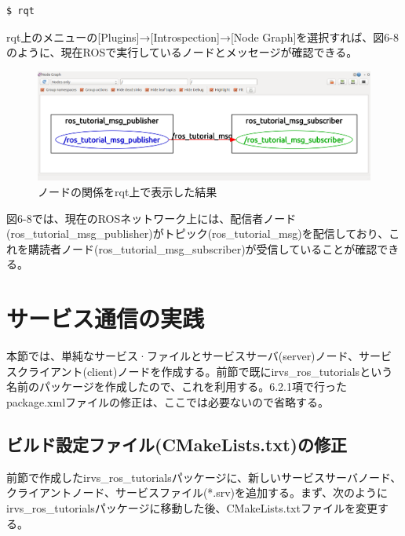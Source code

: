 \begin{lstlisting}[language=ROS]
$ rqt
\end{lstlisting}

rqt上のメニューの[Plugins]→[Introspection]→[Node Graph]を選択すれば、図6-8のように、現在ROSで実行しているノードとメッセージが確認できる。

\begin{figure}[htp]
  \centering
  \includegraphics[width=\columnwidth]{pictures/chapter6/pic_06_08.png}
  \caption{ノードの関係をrqt上で表示した結果}
\end{figure}

図6-8では、現在のROSネットワーク上には、配信者ノード(ros\_tutorial\_msg\_publisher)がトピック(ros\_tutorial\_msg)を配信しており、これを購読者ノード(ros\_tutorial\_msg\_subscriber)が受信していることが確認できる。

\section{サービス通信の実践}

本節では、単純なサービス·ファイルとサービスサーバ(server)ノード、サービスクライアント(client)ノードを作成する。前節で既にirvs\_ros\_tutorialsという名前のパッケージを作成したので、これを利用する。6.2.1項で行ったpackage.xmlファイルの修正は、ここでは必要ないので省略する。

\subsection{ビルド設定ファイル(CMakeLists.txt)の修正}

前節で作成したirvs\_ros\_tutorialsパッケージに、新しいサービスサーバノード、クライアントノード、サービスファイル(*.srv)を追加する。まず、次のようにirvs\_ros\_tutorialsパッケージに移動した後、CMakeLists.txtファイルを変更する。

